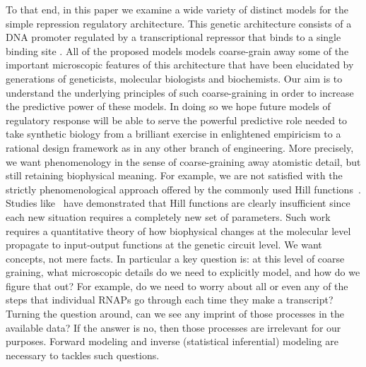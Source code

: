 To that end, in this paper we examine a wide variety of distinct models for the
simple repression regulatory architecture. This genetic architecture consists of
a DNA promoter regulated by a transcriptional repressor that binds to a single
binding site \cite{Garcia2011a}. All of the proposed models models coarse-grain
away some of the important microscopic features of this architecture that have
been elucidated by generations of geneticists, molecular biologists and
biochemists. Our aim is to understand the underlying principles of such
coarse-graining in order to increase the predictive power of these models. In
doing so we hope future models of regulatory response will be able to serve the
powerful predictive role needed to take synthetic biology from a brilliant
exercise in enlightened empiricism to a rational design framework as  in any
other branch of engineering. More precisely, we want phenomenology in the sense
of coarse-graining away atomistic detail, but still retaining biophysical
meaning. For example, we are not satisfied with the strictly phenomenological
approach offered by the commonly used Hill functions~\cite{Frank2013}.
Studies like~\cite{Razo-Mejia2018} have demonstrated that Hill functions are
clearly insufficient since each new situation requires a completely new set of
parameters. Such work requires a quantitative theory of how biophysical changes
at the molecular level propagate to input-output functions at the genetic
circuit level. We want concepts, not mere facts. In particular a key question
is: at this level of coarse graining, what microscopic details do we need to
explicitly model, and how do we figure that out? For example, do we need to
worry about all or even any of the steps that individual RNAPs go through each
time they make a transcript? Turning the question around, can we see any imprint
of those processes in the available data? If the answer is no, then those
processes are irrelevant for our purposes. Forward modeling and inverse
(statistical inferential) modeling are necessary to tackles such questions.

